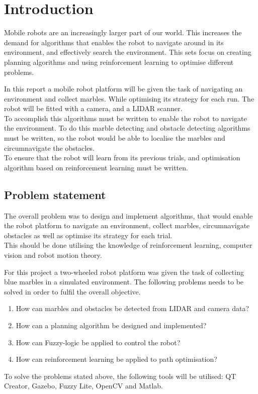 \documentclass[../Head/Main.tex]{subfiles}
\begin{document}
\section{Introduction}
Mobile robots are an increasingly larger part of our world. This increases the demand for algorithms that enables the robot to navigate around in its environment, and effectively search the environment. This sets focus on creating planning algorithms and using reinforcement learning to optimise different problems.\par 
In this report a mobile robot platform will be given the task of navigating an environment and collect marbles. While optimising its strategy for each run. The robot will be fitted with a camera, and a LIDAR scanner.\\
To accomplish this algorithms must be written to enable the robot to navigate the environment. To do this marble detecting and obstacle detecting algorithms must be written, so the robot would be able to localise the marbles and circumnavigate the obstacles.\\
To ensure that the robot will learn from its previous trials, and optimisation algorithm based on reinforcement learning must be written.    

\subsection{Problem statement}
The overall problem was to design and implement algorithms, that would enable the robot platform to navigate an environment, collect marbles, circumnavigate obstacles as well as optimise its strategy for each trial.\\
This should be done utilising the knowledge of reinforcement learning, computer vision and robot motion theory.\par
For this project a two-wheeled robot platform was given the task of collecting blue marbles in a simulated environment. The following problems needs to be solved in order to fulfil the overall objective.

\begin{enumerate}
        \item How can marbles and obstacles be detected from LIDAR and camera data?
		\item How can a planning algorithm be designed and implemented?
		\item How can Fuzzy-logic be applied to control the robot?
		\item How can reinforcement learning be applied to path optimisation?
\end{enumerate}
To solve the problems stated above, the following tools will be utilised: QT Creator, Gazebo, Fuzzy Lite, OpenCV and Matlab.
\end{document}
